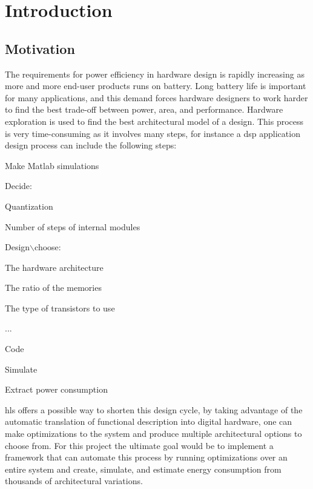 \chapter{Introduction}
\label{chp:introduction} 
\section{\label{sec:motivation}Motivation}
The requirements for power efficiency in hardware design is rapidly increasing as more and more end-user products runs on battery. Long battery life is important for many applications, and this demand forces hardware designers to work harder to find the best trade-off between power, area, and performance. Hardware exploration is used to find the best architectural model of a design. This process is very time-consuming as it involves many steps, for instance a \gls{dsp} application design process can include the following steps:
\begin{compactenum}
    \item Make Matlab simulations 
    \item Decide:
    \begin{compactitem}
        \item Quantization
        \item Number of steps of internal modules
    \end{compactitem}
    \item Design$\backslash$choose:
    \begin{compactitem}
        \item The hardware architecture
        \item The ratio of the memories
        \item The type of transistors to use
    \end{compactitem}
    \item ...
    \item Code
    \item Simulate
    \item Extract power consumption
\end{compactenum}
\gls{hls} offers a possible way to shorten this design cycle, by taking advantage of the automatic translation of functional description into digital hardware, one can make optimizations to the system and produce multiple architectural options to choose from. For this project the ultimate goal would be to implement a framework that can automate this process by running optimizations over an entire system and create, simulate, and estimate energy consumption from thousands of architectural variations. 

